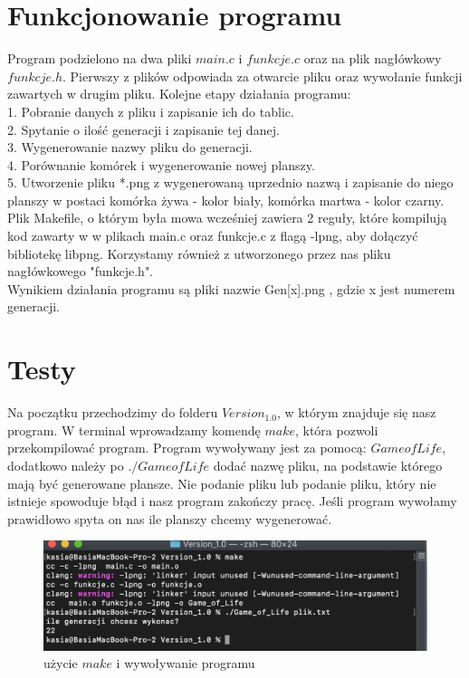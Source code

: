 \documentclass[11pt]{article}
\begin{document}
\section{Funkcjonowanie programu}
Program podzielono na dwa pliki $main.c$ i $funkcje.c$ oraz na plik nagłówkowy $funkcje.h$. Pierwszy z plików odpowiada za otwarcie pliku oraz wywołanie funkcji zawartych w drugim pliku.
Kolejne etapy działania programu:
\\
1.	Pobranie danych z pliku i zapisanie ich do tablic.
\\
2.	Spytanie o ilość generacji i zapisanie tej danej.
\\
3.	Wygenerowanie nazwy pliku do generacji.
\\
4.	Porównanie komórek i wygenerowanie nowej planszy.
\\
5.  Utworzenie pliku *.png z wygenerowaną uprzednio nazwą i zapisanie do niego planszy w postaci komórka żywa - kolor biały, komórka martwa - kolor czarny.
\\
Plik Makefile, o którym była mowa wcześniej zawiera 2 reguły, które kompilują kod zawarty w w plikach main.c oraz funkcje.c z flagą -lpng, aby dołączyć bibliotekę libpng. Korzystamy również z utworzonego przez nas pliku nagłówkowego "funkcje.h".
\\
Wynikiem działania programu są pliki nazwie Gen[x].png , gdzie x jest numerem generacji.

\section{Testy}
Na początku przechodzimy do folderu $Version_1.0$, w którym znajduje się nasz program. W terminal wprowadzamy komendę $make$, która pozwoli przekompilować program. Program wywoływany jest za pomocą: $GameofLife$, dodatkowo należy po $./GameofLife$ dodać nazwę pliku, na podstawie którego mają być generowane plansze. Nie podanie pliku lub podanie pliku, który nie istnieje spowoduje błąd i nasz program zakończy pracę. Jeśli program wywołamy prawidłowo spyta on nas ile planszy chcemy wygenerować.

\begin{figure}[h!]
	\includegraphics[width=\linewidth]{wywolanie.png}
	\caption{użycie $make$ i wywoływanie programu}
\end{figure}
\end{document}
